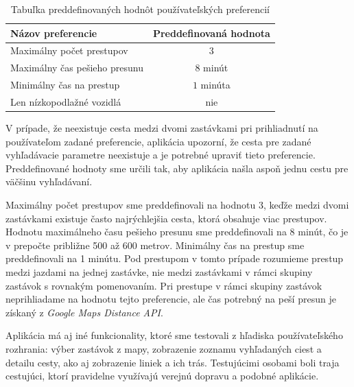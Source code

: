 \begin{table}[H]
\small
\begin{center}
\begin{tabular}{|l|c|}
\hline
\rowcolor[HTML]{C0C0C0} 
\textbf{Názov preferencie} & \textbf{Preddefinovaná hodnota} \\ \hline
Maximálny počet prestupov  & $3$         \\ \hline
Maximálny čas pešieho presunu & $8$  minút  \\ \hline
Minimálny čas na prestup & $1$ minúta  \\ \hline
Len nízkopodlažné vozidlá & nie  \\ \hline
\end{tabular}
\end{center}
\caption{Tabuľka preddefinovaných hodnôt používateľských preferencií}
\label{table:default-preferencies}
\end{table}

V prípade, že neexistuje cesta medzi dvomi zastávkami pri prihliadnutí na používateľom zadané preferencie, aplikácia upozorní, že cesta pre zadané vyhľadávacie parametre neexistuje a je potrebné upraviť tieto preferencie. Preddefinované hodnoty sme určili tak, aby aplikácia našla aspoň jednu cestu pre väčšinu vyhľadávaní.

Maximálny počet prestupov sme preddefinovali na hodnotu 3, keďže medzi dvomi zastávkami existuje často najrýchlejšia cesta, ktorá obsahuje viac prestupov. Hodnotu maximálneho času pešieho presunu sme preddefinovali na 8 minút, čo je v prepočte približne 500 až 600 metrov. Minimálny čas na prestup sme preddefinovali na 1 minútu. Pod prestupom v tomto prípade rozumieme prestup medzi jazdami na jednej zastávke, nie medzi zastávkami v rámci skupiny zastávok s rovnakým pomenovaním. Pri prestupe v rámci skupiny zastávok neprihliadame na hodnotu tejto preferencie, ale čas potrebný na peší presun je získaný z \textit{Google Maps Distance API}.

Aplikácia má aj iné funkcionality, ktoré sme testovali z hľadiska používateľského rozhrania: výber zastávok z mapy, zobrazenie zoznamu vyhľadaných ciest a detailu cesty, ako aj zobrazenie liniek a ich trás. Testujúcimi osobami boli traja cestujúci, ktorí pravidelne využívajú verejnú dopravu a podobné aplikácie.


